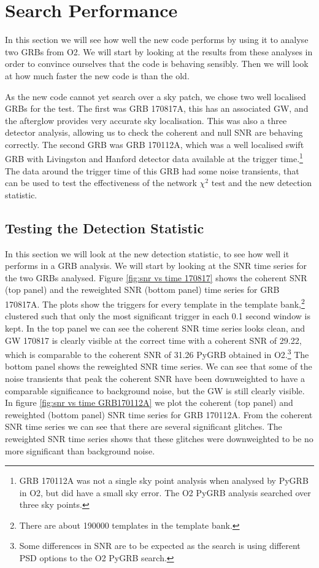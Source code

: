 \documentclass[11pt]{cuthesis}
\begin{document}
\FloatBarrier
\section{Search Performance} \label{sec:new pygrb performance}
In this section we will see how well the new code performs by using it to analyse two GRBs from O2. We will start by looking at the results from these analyses in order to convince ourselves that the code is behaving sensibly. Then we will look at how much faster the new code is than the old. 

As the new code cannot yet search over a sky patch, we chose two well localised GRBs for the test. The first was GRB 170817A, this has an associated GW, and the afterglow provides very accurate sky localisation. This was also a three detector analysis, allowing us to check the coherent and null SNR are behaving correctly. The second GRB was GRB 170112A, which was a well localised swift GRB with Livingston and Hanford detector data available at the trigger time.\footnote{GRB 170112A was not a single sky point analysis when analysed by PyGRB in O2, but did have a small sky error. The O2 PyGRB analysis searched over three sky points.} The data around the trigger time of this GRB had some noise transients, that can be used to test the effectiveness of the network $\chi^2$ test and the new detection statistic.


\subsection{Testing the Detection Statistic}
In this section we will look at the new detection statistic, to see how well it performs in a GRB analysis. We will start by looking at the SNR time series for the two GRBs analysed. Figure \ref{fig:snr vs time 170817} shows the coherent SNR (top panel) and the reweighted SNR (bottom panel) time series for GRB 170817A. The plots show the triggers for every template in the template bank,\footnote{There are about 190000 templates in the template bank.} clustered such that only the most significant trigger in each 0.1 second window is kept. In the top panel we can see the coherent SNR time series looks clean, and GW 170817 is clearly visible at the correct time with a coherent SNR of 29.22, which is comparable to the coherent SNR of 31.26 PyGRB obtained in O2.\footnote{Some differences in SNR are to be expected as the search is using different PSD options to the O2 PyGRB search.} The bottom panel shows the reweighted SNR time series. We can see that some of the noise transients that peak the coherent SNR have been downweighted to have a comparable significance to background noise, but the GW is still clearly visible. In figure \ref{fig:snr vs time GRB170112A} we plot the coherent (top panel) and reweighted (bottom panel) SNR time series for GRB 170112A. From the coherent SNR time series we can see that there are several significant glitches. The reweighted SNR time series shows that these glitches were downweighted to be no more significant than background noise. 
\end{document}
